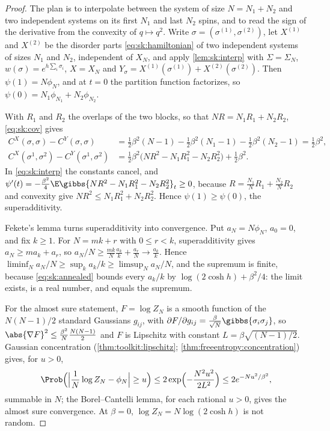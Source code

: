 \begin{refsection}
\begin{proof}
The plan is to interpolate between the system of size $N=N_1+N_2$ and two independent systems on its first $N_1$ and last $N_2$ spins, and to read the sign of the derivative from the convexity of $q\mapsto q^2$. Write $\sigma=(\sigma^{(1)},\sigma^{(2)})$, let $X^{(1)}$ and $X^{(2)}$ be the disorder parts \eqref{eq:sk:hamiltonian} of two independent systems of sizes $N_1$ and $N_2$, independent of $X_N$, and apply \cref{lem:sk:interp} with $\Sigma=\Sigma_N$, $w(\sigma)=e^{h\sum_i\sigma_i}$, $X=X_N$ and $Y_\sigma=X^{(1)}(\sigma^{(1)})+X^{(2)}(\sigma^{(2)})$. Then $\psi(1)=N\phi_N$, and at $t=0$ the partition function factorizes, so $\psi(0)=N_1\phi_{N_1}+N_2\phi_{N_2}$.

With $R_1$ and $R_2$ the overlaps of the two blocks, so that $NR=N_1R_1+N_2R_2$, \eqref{eq:sk:cov} gives
\begin{align*}
C^X(\sigma,\sigma)-C^Y(\sigma,\sigma)&=\tfrac12\beta^2(N-1)-\tfrac12\beta^2(N_1-1)-\tfrac12\beta^2(N_2-1)=\tfrac12\beta^2,\\
C^X(\sigma^1,\sigma^2)-C^Y(\sigma^1,\sigma^2)&=\tfrac12\beta^2\bigl(NR^2-N_1R_1^2-N_2R_2^2\bigr)+\tfrac12\beta^2.
\end{align*}
In \eqref{eq:sk:interp} the constants cancel, and $\psi'(t)=-\frac{\beta^2}4\E\gibbs{NR^2-N_1R_1^2-N_2R_2^2}_t\ge0$, because $R=\frac{N_1}NR_1+\frac{N_2}NR_2$ and convexity give $NR^2\le N_1R_1^2+N_2R_2^2$. Hence $\psi(1)\ge\psi(0)$, the superadditivity.

Fekete's lemma turns superadditivity into convergence. Put $a_N=N\phi_N$, $a_0=0$, and fix $k\ge1$. For $N=mk+r$ with $0\le r<k$, superadditivity gives $a_N\ge ma_k+a_r$, so $a_N/N\ge\frac{mk}N\frac{a_k}k+\frac{a_r}N\to\frac{a_k}k$. Hence $\liminf_Na_N/N\ge\sup_ka_k/k\ge\limsup_Na_N/N$, and the supremum is finite, because \eqref{eq:sk:annealed} bounds every $a_k/k$ by $\log(2\cosh h)+\beta^2/4$: the limit exists, is a real number, and equals the supremum.

For the almost sure statement, $F=\log Z_N$ is a smooth function of the $N(N-1)/2$ standard Gaussians $g_{ij}$, with $\partial F/\partial g_{ij}=\frac\beta{\sqrt N}\gibbs{\sigma_i\sigma_j}$, so $\abs{\nabla F}^2\le\frac{\beta^2}N\frac{N(N-1)}2$ and $F$ is Lipschitz with constant $L=\beta\sqrt{(N-1)/2}$. Gaussian concentration (\cref{thm:toolkit:lipschitz}; \cref{thm:freeentropy:concentration}) gives, for $u>0$,
\[
\Prob\Bigl(\Bigl|\frac1N\log Z_N-\phi_N\Bigr|\ge u\Bigr)\le2\exp\Bigl(-\frac{N^2u^2}{2L^2}\Bigr)\le2e^{-Nu^2/\beta^2},
\]
summable in $N$; the Borel--Cantelli lemma, for each rational $u>0$, gives the almost sure convergence. At $\beta=0$, $\log Z_N=N\log(2\cosh h)$ is not random.
\end{proof}


\end{refsection}
